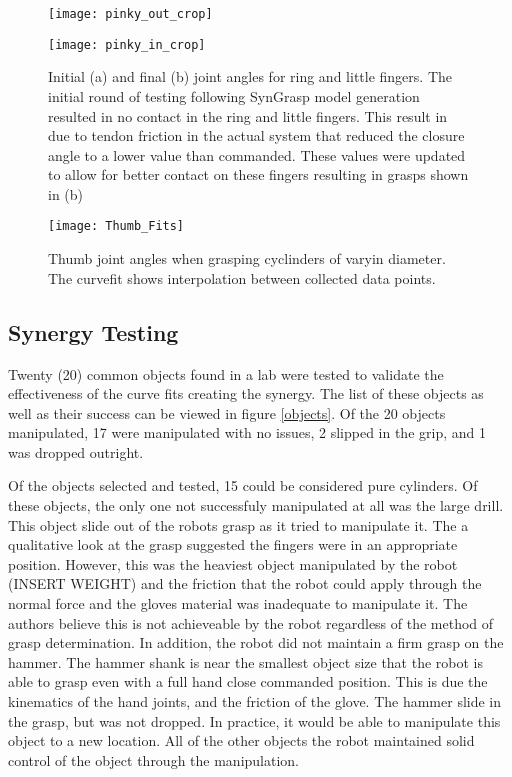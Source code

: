 \documentclass[letterpaper, 10 pt, conference]{ieeeconf}  %
\begin{document}
\begin{figure}[t]
\centering
  \begin{minipage}{2in}
      \texttt{[image: pinky\_out\_crop]}
      \subcaption{}
  \end{minipage}%
  \begin{minipage}{2in}
      \texttt{[image: pinky\_in\_crop]}
      \subcaption{}
  \end{minipage}
\caption{Initial (a) and final (b) joint angles for ring and little fingers. The initial round of testing following SynGrasp model generation resulted in no contact in the ring and little fingers.  This result in due to tendon friction in the actual system that reduced the closure angle to a lower value than commanded.  These values were updated to allow for better contact on these fingers resulting in grasps shown in (b)}%
\label{fig:models}%
\end{figure}

\begin{figure}[!b]
  \centering
  \texttt{[image: Thumb\_Fits]}
  \caption{Thumb joint angles when grasping cyclinders of varyin diameter.  The curvefit shows interpolation between collected data points.}
  \label{thumb_fits} 
\end{figure}

\subsection{Synergy Testing}

Twenty (20) common objects found in a lab were tested to validate the effectiveness of the curve fits creating the synergy. The list of these objects as well as their success can be viewed in figure \ref{objects}.  Of the 20 objects manipulated, 17 were manipulated with no issues, 2 slipped in the grip, and 1 was dropped outright. 

Of the objects selected and tested, 15 could be considered pure cylinders. Of these objects, the only one not successfuly manipulated at all was the large drill. This object slide out of the robots grasp as it tried to manipulate it. The a qualitative look at the grasp suggested the fingers were in an appropriate position. However, this was the heaviest object manipulated by the robot (INSERT WEIGHT) and the friction that the robot could apply through the normal force and the gloves material was inadequate to manipulate it. The authors believe this is not achieveable by the robot regardless of the method of grasp determination. In addition, the robot did not maintain a firm grasp on the hammer. The hammer shank is near the smallest object size that the robot is able to grasp even with a full hand close commanded position. This is due the kinematics of the hand joints, and the friction of the glove. The hammer slide in the grasp, but was not dropped. In practice, it would be able to manipulate this object to a new location. All of the other objects the robot maintained solid control of the object through the manipulation. 
\end{document}
